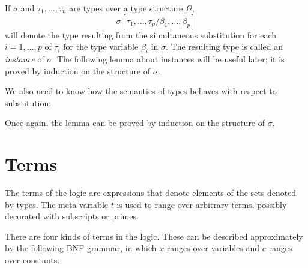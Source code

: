 If $\sigma$ and $\tau_1,\ldots,\tau_n$ are types over a type structure
$\Omega$,
\[
\sigma[\tau_{1},\ldots,\tau_{p}/\beta_{1},\ldots,\beta_{p}]
\]
will denote the type resulting from the simultaneous substitution for
each $i=1,\ldots,p$ of
$\tau_i$ for the type variable $\beta_i$ in $\sigma$.
The resulting type is called an {\it instance\/} of $\sigma$. The
following lemma about instances will be useful later; it is proved by
induction on the structure of $\sigma$.

\medskip


\medskip

We also need to know how the semantics of types behaves with respect
to substitution:

\medskip

Once again, the lemma can be proved by induction on the structure of
$\sigma$.

\section{Terms}
\label{terms}

The terms of the \HOL{} logic are expressions that denote elements of the sets
denoted by types. The meta-variable $t$
is used to range over arbitrary terms, possibly decorated
with subscripts or primes.

There are four kinds of terms in the \HOL{} logic. These can be
described approximately by the following {\small BNF} grammar, in
which $x$ ranges over variables and $c$ ranges over constants.


